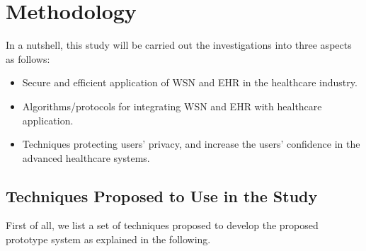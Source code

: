 \documentclass[a4paper,11pt]{article}
\begin{document}
\section{Methodology}
In a nutshell, this study will be carried out the investigations into three aspects as follows:
\begin{itemize}
\item Secure and efficient application of WSN and EHR in the healthcare industry.
\item Algorithms/protocols for integrating WSN and EHR with healthcare application.
\item Techniques protecting users' privacy, and increase the users' confidence in the advanced healthcare systems.
\end{itemize}


\subsection{Techniques Proposed to Use in the Study}
First of all, we list a set of techniques proposed to develop the proposed prototype system as explained in the following.
\end{document}
